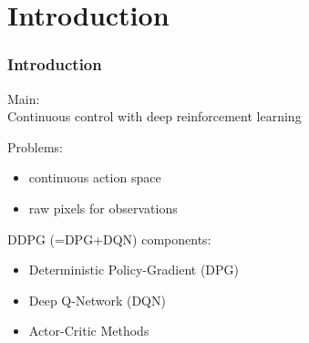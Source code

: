 \section{Introduction}

\begin{frame}
\frametitle{Introduction}
Main:\\
Continuous control with deep reinforcement learning~\cite{Lillicrap2015}
\vspace{2mm}

Problems:
\begin{itemize}
  \item continuous action space
  \item raw pixels for observations
\end{itemize}

DDPG (=DPG+DQN) components:
\begin{itemize}
  \item Deterministic Policy-Gradient (DPG) \cite{Silver2014}
  \item Deep Q-Network (DQN) \cite{Mnih2013}
  \item Actor-Critic Methods \cite{Sutton1998}
\end{itemize}



\end{frame}
